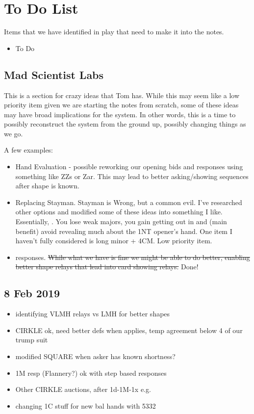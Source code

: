 \documentclass[tom-ari]{subfile}
\begin{document}
	
	\chapter{To Do List}
	
	Items that we have identified in play that need to make it into the notes.
	\begin{itemize}
		\item To Do
	\end{itemize}

	\section{Mad Scientist Labs}
	
	This is a section for crazy ideas that Tom has.  While this may seem like a low priority item given we are starting the notes from scratch, some of these ideas may have broad implications for the system.  In other words, this is a time to possibly reconstruct the system from the ground up, possibly changing things as we go.
	
	A few examples:
	
	\begin{itemize}
		\item Hand Evaluation - possible reworking our opening bids and responses using something like ZZs or Zar.  This may lead to better asking/showing sequences after shape is known.
		\item Replacing Stayman.  Stayman is Wrong, but a common evil.  I've researched other options and modified some of these ideas into something I like.  Essentially, \rightarrow{}.  You lose weak majors, you gain getting out in  and (main benefit) avoid revealing much about the 1NT opener's hand.  One item I haven't fully considered is long minor + 4CM.  Low priority item.
		\item {} responses.  \sout{While what we have is fine we might be able to do better, enabling better shape relays that lead into card showing relays.} Done!
	\end{itemize}

	\section{8 Feb 2019}
	\begin{itemize}
		\item identifying VLMH relays vs LMH for better shapes
		\item CIRKLE ok, need better defs when applies, temp agreement below 4 of our trump suit
		\item modified SQUARE when asker has known shortness?
		\item 1M resp (Flannery?) ok with step based responses 
		\item Other CIRKLE auctions, after 1d-1M-1x e.g.
		\item changing 1C stuff for new bal hands with 5332
	\end{itemize}
\end{document}
